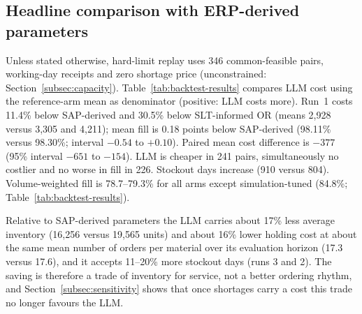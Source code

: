 \documentclass[preprint,12pt,nonatbib]{elsarticle}
\begin{document}
\subsection{Headline comparison with ERP-derived parameters}\label{subsec:headline}
Unless stated otherwise, hard-limit replay uses 346 common-feasible pairs, working-day receipts and zero shortage price (unconstrained: Section~\ref{subsec:capacity}). Table~\ref{tab:backtest-results} compares LLM cost using the reference-arm mean as denominator (positive: LLM costs more). Run~1 costs 11.4\% below SAP-derived and 30.5\% below SLT-informed OR (means 2{,}928 versus 3{,}305 and 4{,}211); mean fill is 0.18 points below SAP-derived (98.11\% versus 98.30\%; interval $-0.54$ to $+0.10$). Paired mean cost difference is $-377$ (95\% interval $-651$ to $-154$). LLM is cheaper in 241 pairs, simultaneously no costlier and no worse in fill in 226. Stockout days increase (910 versus 804). Volume-weighted fill is 78.7--79.3\% for all arms except simulation-tuned (84.8\%; Table~\ref{tab:backtest-results}).

Relative to SAP-derived parameters the LLM carries about 17\% less average inventory (16{,}256 versus 19{,}565 units) and about 16\% lower holding cost at about the same mean number of orders per material over its evaluation horizon (17.3 versus 17.6), and it accepts 11--20\% more stockout days (runs 3 and 2). The saving is therefore a trade of inventory for service, not a better ordering rhythm, and Section~\ref{subsec:sensitivity} shows that once shortages carry a cost this trade no longer favours the LLM.
\end{document}
